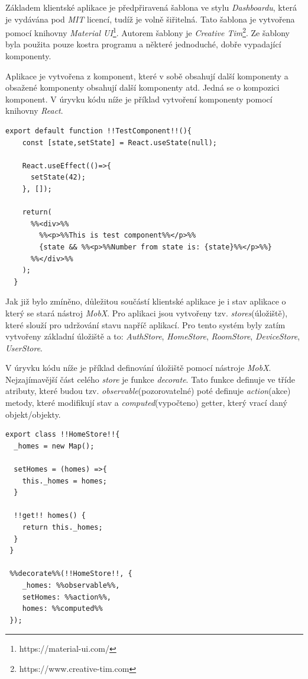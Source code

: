 Základem klientské aplikace je předpřiravená šablona ve stylu \emph{Dashboardu}, která je vydávána pod \emph{MIT} licencí, tudíž je volně šiřitelná.
Tato šablona je vytvořena pomocí knihovny \emph{Material UI}\footnote{https://material-ui.com/}. Autorem šablony je \emph{Creative Tim}\footnote{https://www.creative-tim.com}.
Ze šablony byla použita pouze kostra programu a některé jednoduché, dobře vypadající komponenty.

Aplikace je vytvořena z komponent, které v sobě obsahují další komponenty a obsažené komponenty obsahují další komponenty atd.
Jedná se o kompozici komponent.
V úryvku kódu níže je příklad vytvoření komponenty pomocí knihovny \emph{React}.

\begin{lstlisting}[style=JavaScriptStyle,caption={Ukázka asociace 1:N (domácnost:místnosti)}]
  export default function !!TestComponent!!(){
    const [state,setState] = React.useState(null);

    React.useEffect(()=>{
      setState(42);
    }, []);
    
    return(
      %%<div>%%
        %%<p>%%This is test component%%</p>%%
        {state && %%<p>%%Number from state is: {state}%%</p>%%}
      %%</div>%%
    );
  }
\end{lstlisting}

Jak již bylo zmíněno, důležitou součástí klientské aplikace je i stav aplikace o který se stará nástroj \emph{MobX}.
Pro aplikaci jsou vytvořeny tzv. \emph{stores}(úložiště), které slouží pro udržování stavu napříč aplikací.
Pro tento systém byly zatím vytvořeny základní úložiště a to: \emph{AuthStore}, \emph{HomeStore}, \emph{RoomStore}, \emph{DeviceStore}, \emph{UserStore}.

\newpage
V úryvku kódu níže je příklad definování úložiště pomocí nástroje \emph{MobX}.
Nejzajímavější část celého \emph{store} je funkce \emph{decorate}.
Tato funkce definuje ve tříde atributy, které budou tzv. \emph{observable}(pozorovatelné) poté definuje \emph{action}(akce) metody,
které modifikují stav a \emph{computed}(vypočteno) getter, který vrací daný objekt/objekty.

\begin{lstlisting}[style=JavaScriptStyle,caption={Ukázka asociace 1:N (domácnost:místnosti)}]
 export class !!HomeStore!!{
  _homes = new Map();

  setHomes = (homes) =>{
    this._homes = homes;
  }

  !!get!! homes() {
    return this._homes;
  }
 }

 %%decorate%%(!!HomeStore!!, {
    _homes: %%observable%%,
    setHomes: %%action%%,
    homes: %%computed%%
 });
\end{lstlisting}

